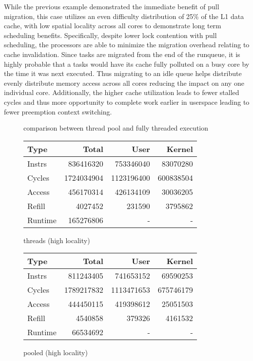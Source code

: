 \documentclass[11pt]{article}
\begin{document}
While the previous example demonstrated the immediate benefit of pull migration, this case utilizes an even difficulty distribution of 25\% of the L1 data cache, with low spatial locality across all cores to demonstrate long term scheduling benefits.  Specifically, despite lower lock contention with pull scheduling, the processors are able to minimize the migration overhead relating to cache invalidation.  Since tasks are migrated from the end of the runqueue, it is highly probable that a tasks would have its cache fully polluted on a busy core by the time it was next executed.  Thus migrating to an idle queue helps distribute evenly distribute memory access across all cores reducing the impact on any one individual core.  Additionally, the higher cache utilization leads to fewer stalled cycles and thus more opportunity to complete work earlier in userspace leading to fewer preemption context switching.

\begin{figure*}[h]
	\caption{comparison between thread pool and fully threaded execution}
	\centering
	\begin{subtable}{.48\textwidth}
		\centering
		\begin{tabular}{ l|rrr }
			Type    & Total      & User       & Kernel    \\
			\hline
			Instrs  & 836416320  & 753346040  & 83070280  \\ 
			Cycles  & 1724034904 & 1123196400 & 600838504 \\ 
			Access  & 456170314  & 426134109  & 30036205  \\ 
			Refill  & 4027452    & 231590     & 3795862   \\ 
			Runtime & 165276806  & -          & -         \\
			\hline
		\end{tabular}
		\caption{threads (high locality)}
	\end{subtable}
	\hfill
	\begin{subtable}{.48\textwidth} 
		\centering
		\begin{tabular}{ l|rrr }
			Type    & Total      & User       & Kernel    \\
			\hline
			Instrs  & 811243405  & 741653152  & 69590253  \\ 
			Cycles  & 1789217832 & 1113471653 & 675746179 \\ 
			Access  & 444450115  & 419398612  & 25051503  \\ 
			Refill  & 4540858    & 379326     & 4161532   \\ 
			Runtime & 66534692   & -          & -         \\
			\hline
		\end{tabular}
		\caption{pooled (high locality)}        
	\end{subtable}
\end{figure*}
\end{document}

